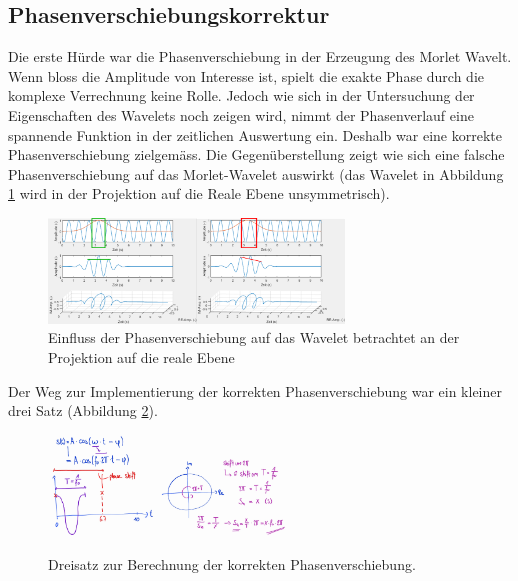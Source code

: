 \subsection{Phasenverschiebungskorrektur
	\label{wavelets:subsection:Phasenverschiebung}}
Die erste Hürde war die Phasenverschiebung in der Erzeugung des Morlet Wavelt. Wenn bloss die Amplitude von Interesse ist, spielt die exakte Phase durch die komplexe Verrechnung keine Rolle. Jedoch wie sich in der Untersuchung der Eigenschaften des Wavelets noch zeigen wird, nimmt der Phasenverlauf eine spannende Funktion in der zeitlichen Auswertung ein. Deshalb war eine korrekte Phasenverschiebung zielgemäss. Die Gegenüberstellung zeigt wie sich eine falsche Phasenverschiebung auf das Morlet-Wavelet auswirkt (das Wavelet in Abbildung \ref{wavelet:fig:PhaseShiftFailVsCor} wird in der Projektion auf die Reale Ebene unsymmetrisch).

\begin{figure}
	\centering
	\includegraphics[width=0.7\textwidth]{papers/wavelets/images/9_PhaseShiftFailVsCor.png}
	\caption{Einfluss der Phasenverschiebung auf das Wavelet betrachtet an der Projektion auf die reale Ebene}
	\label{wavelet:fig:PhaseShiftFailVsCor}
\end{figure}

Der Weg zur Implementierung der korrekten Phasenverschiebung war ein kleiner drei Satz (Abbildung \ref{wavelet:fig:PhaseCalc}).

\begin{figure}
	\centering
	\includegraphics[width=0.25\textwidth]{papers/wavelets/images/10-1_PhaseCalc1.png}
	\includegraphics[width=0.3\textwidth]{papers/wavelets/images/10-2_PhaseCalc2.png}
	\caption{Dreisatz zur Berechnung der korrekten Phasenverschiebung.}
	\label{wavelet:fig:PhaseCalc}
\end{figure}

